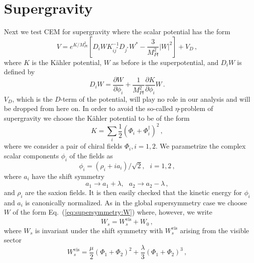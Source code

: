 \documentclass[12pt]{article}
\begin{document}
\section{Supergravity \label{sec:Supergravity}}
Next we test CEM for supergravity where the scalar potential has the form~\cite{Chamseddine:1982jx, Cremmer:1982en}
\begin{equation} \label{eq:supergravity:potential}
  V = e^{K / M_{Pl}^2} \left[
    D_i W K^{-1}_{ij^*} D_{j^*} W^* - \frac{3}{M_{Pl}^2} \left|W\right|^2
  \right] + V_D\,,
\end{equation}
where $K$ is the K\"ahler potential, $W$ as before is the superpotential, and $D_i W$ is defined by
\begin{equation} \label{eq:supergravity:DW}
  D_i W = \frac{\partial W}{\partial \phi_i}
        + \frac{1}{M_{Pl}^2} \frac{\partial K}{\partial \phi_i} W\,.
\end{equation}
$V_D$, which is the $D$-term of the potential, will play no role in our analysis and will be dropped from here on.
In order to avoid the so-called $\eta$-problem of supergravity we choose the K\"ahler potential to be of the form
\begin{equation}
  K = \sum_i \frac{1}{2} \left(\Phi_i + \Phi_i^\dagger\right)^2\,,
\end{equation}
where we consider a pair of chiral fields $\Phi_i, i = 1, 2$.
We parametrize the complex scalar components $\phi_i$ of the fields as
\begin{equation}
  \phi_i = \left(\rho_i + i a_i\right) / \sqrt 2,
  ~~~ i = 1, 2\,,
\end{equation}
where $a_i$ have the shift symmetry
\begin{equation}
  a_1 \to a_1 + \lambda,
  ~~~ a_2 \to a_2 - \lambda\,,
\end{equation}
and $\rho_i$ are the saxion fields.
It is then easily checked that the kinetic energy for $\phi_i$ and $a_i$ is canonically normalized.
As in the global supersymmetry case we choose $W$ of the form Eq.~(\ref{eq:supersymmetry:W}) where, however, we write
\begin{equation}
  W_s = W_s^\text{vis} + W_0\,,
\end{equation}
where $W_s$ is invariant under the shift symmetry with $W_s^\text{vis}$ arising from the visible sector
\begin{equation}
  W_s^\text{vis} =
      \frac{\mu}{2} \left(\Phi_1 + \Phi_2\right)^2
    + \frac{\lambda}{3} \left(\Phi_1 + \Phi_2\right)^3\,,
\end{equation}
\end{document}
